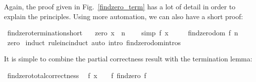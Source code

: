\begin{isabellebody}
%
\begin{isamarkuptext}%
Again, the proof given in Fig.~\ref{findzero_term} has a lot of
  detail in order to explain the principles. Using more automation, we
  can also have a short proof:%
\end{isamarkuptext}%
\isamarkuptrue%
\isamarkupfalse%
\ findzero{}termination{}short{}\isanewline
\ \ \ zero{}\ {}x\ {}{}\ n{}\ \isanewline
\ \ \ {}simp{}{}\ {}f\ x\ {}\ {}{}\isanewline
\ \ \ {}findzero{}dom\ {}f{}\ n{}{}\isanewline
%
\isadelimproof
%
\endisadelimproof
%
\isatagproof
{}\isamarkupfalse%
\ zero\isanewline
{}\isamarkupfalse%
\ {}induct\ rule{}inc{}induct{}\ {}auto\ intro{}\ findzero{}domintros{}%
\endisatagproof
{\isafoldproof}%
%
\isadelimproof
%
\endisadelimproof
%
\begin{isamarkuptext}%
\noindent It is simple to combine the partial correctness result with the
  termination lemma:%
\end{isamarkuptext}%
\isamarkuptrue%
\isamarkupfalse%
\ findzero{}total{}correctness{}\isanewline
\ \ {}f\ x\ {}\ {}\ {}\ f\ {}findzero\ f\ {}{}\ {}\ {}{}\isanewline

\end{isabellebody}
